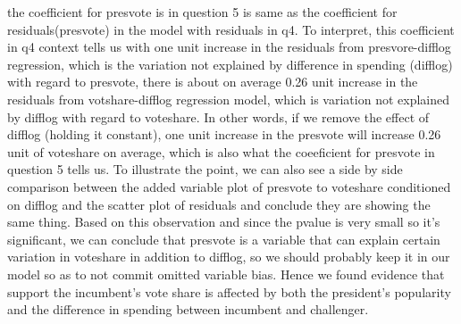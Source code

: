 \documentclass[12pt,letterpaper]{article}
\begin{document}
the coefficient for presvote is in question 5 is same as the coefficient for residuals(presvote) in the model with residuals in q4. To interpret, this coefficient in q4 context tells us with one unit increase  in the  residuals from presvore-difflog regression, which is the variation not explained by difference in spending (difflog) with regard to presvote, there is about on average 0.26 unit increase in the residuals from votshare-difflog regression model, which is variation not explained by difflog with regard to voteshare. In other words, if we remove the effect of difflog (holding it constant), one unit increase in the presvote will increase  0.26 unit of voteshare on average, which is also what the coeeficient for presvote in question 5 tells us. To illustrate the point, we can also see a side by side comparison between the added variable plot of presvote to voteshare conditioned on difflog and the scatter plot of residuals and conclude they are showing the same thing. Based on this observation and since the pvalue is very small so it's significant, we can conclude that presvote is a variable that can explain certain variation in voteshare in addition to difflog, so we should probably keep it in our model so as to not commit omitted variable bias. Hence we found evidence that support the incumbent's vote share is affected by both the president's popularity and the difference in spending between incumbent and challenger.
\end{document}
